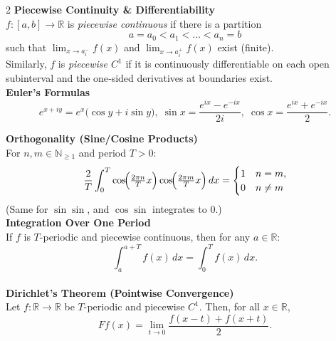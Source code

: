 \documentclass[8pt]{article}
\begin{document}
\begingroup
\setlength{\abovedisplayskip}{3pt}
\setlength{\belowdisplayskip}{3pt}
\setlength{\abovedisplayshortskip}{2pt}
\setlength{\belowdisplayshortskip}{2pt}

\let\oldenumerate\enumerate
\def\enumerate{\oldenumerate
	\setlength{\itemsep}{0pt}
	\setlength{\parskip}{0pt}
	\setlength{\parsep}{0pt}
}
\let\olditemize\itemize
\def\itemize{\olditemize
	\setlength{\itemsep}{0pt}
	\setlength{\parskip}{0pt}
	\setlength{\parsep}{0pt}
}
\small
\vspace*{-30px}
\begin{multicols}{2}
	\noindent \textbf{Piecewise Continuity \& Differentiability}\\
	$f:[a,b]\to\mathbb{R}$ is \emph{piecewise continuous} if there is a partition
	\[
		a=a_0 < a_1 < \dots < a_n = b
	\]
	such that $\lim_{x \to a_i^-} f(x)$ and $\lim_{x \to a_i^+} f(x)$ exist (finite).\\
	Similarly, $f$ is \emph{piecewise $C^1$} if it is continuously differentiable on each open subinterval and the one‐sided derivatives at boundaries exist.\\

	\noindent \textbf{Euler's Formulas}
	\[
		e^{x+iy} = e^{x}\bigl(\cos y + i \sin y\bigr),\;
		\sin x = \frac{e^{ix}-e^{-ix}}{2i},\;
		\cos x = \frac{e^{ix}+e^{-ix}}{2}.
	\]

	\noindent \textbf{Orthogonality (Sine/Cosine Products)}\\
	For $n,m \in \mathbb{N}_{\ge 1}$ and period $T>0$:
	\[
		\frac{2}{T} \int_{0}^{T}
		\cos\!\Bigl(\tfrac{2\pi n}{T}x\Bigr)\cos\!\Bigl(\tfrac{2\pi m}{T}x\Bigr)\,dx
		=
		\begin{cases}
			1 & n=m,    \\
			0 & n\neq m
		\end{cases}
	\]
	(Same for $\sin\sin$, and $\cos\sin$ integrates to $0$.)\\

	\noindent \textbf{Integration Over One Period}\\
	If $f$ is $T$-periodic and piecewise continuous, then for any $a\in\mathbb{R}$:
	\[
		\int_{a}^{a+T} f(x)\,dx = \int_{0}^{T} f(x)\,dx.
	\]\\[-4px]
	\noindent \textbf{Dirichlet's Theorem (Pointwise Convergence)}\\
	Let \( f : \mathbb{R} \to \mathbb{R} \) be \( T \)-periodic and piecewise \( C^1 \). Then, for all \( x \in \mathbb{R} \),
	\[
		Ff(x) = \lim_{t \to 0} \frac{f(x - t) + f(x + t)}{2}.
	\]


\end{multicols}
\end{document}
